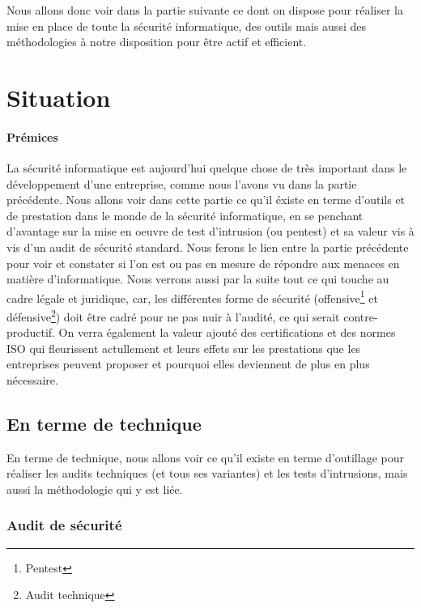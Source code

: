 \documentclass[a4paper]{memoir}
\begin{document}
Nous allons donc voir dans la partie suivante ce dont on dispose pour réaliser la mise en place de toute la sécurité informatique, des outils mais aussi des méthodologies à notre disposition pour être actif et efficient.

\part{Situation}

\subsection{Prémices}

La sécurité informatique est aujourd'hui quelque chose de très important dans le développement d'une entreprise, comme nous l'avons vu dans la partie précédente. Nous allons voir dans cette partie ce qu'il éxiste en terme d'outils et de prestation dans le monde de la sécurité informatique, en se penchant d'avantage sur la mise en oeuvre de test d'intrusion (ou pentest) et sa valeur vis à vis d'un audit de sécurité standard. Nous ferons le lien entre la partie précédente pour voir et constater si l'on est ou pas en mesure de répondre aux menaces en matière d'informatique. Nous verrons aussi par la suite tout ce qui touche au cadre légale et juridique, car, les différentes forme de sécurité (offensive\footnote{Pentest} et défensive\footnote{Audit technique}) doit être cadré pour ne pas nuir à l'audité, ce qui serait contre-productif. On verra également la valeur ajouté des certifications et des normes ISO qui fleurissent actullement et leurs effets sur les prestations que les entreprises peuvent proposer et pourquoi elles deviennent de plus en plus nécessaire. 

\chapter{En terme de technique}

En terme de technique, nous allons voir ce qu'il existe en terme d'outillage pour réaliser les audits techniques (et tous ses variantes) et les tests d'intrusions, mais aussi la méthodologie qui y est liée. 

\section{Audit de sécurité}
\end{document}
